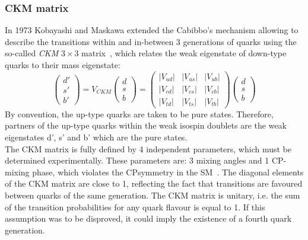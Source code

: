 \subsubsection{CKM matrix}
\label{sec:ckm}
In 1973 Kobayashi and Maskawa extended the Cabibbo's mechanism allowing to describe the transitions within and in-between 3 generations of quarks
using the so-called \textit{CKM} $3\times3$ matrix~\cite{cabibbo,ckm}, which relates the weak eigenstate of down-type quarks to their mass eigenstate:
\begin{equation}
	\begin{pmatrix}
	d' \\ 
	s' \\ 
	b' 
	\end{pmatrix} 
	= V_{CKM}
	\begin{pmatrix}
	d \\ 
	s \\ 
	b
	\end{pmatrix} 
	=
	\begin{pmatrix}
	|V_{ud}| & |V_{us}| & |V_{ub}| \\ 
	|V_{cd}| & |V_{cs}| & |V_{cb}| \\ 
	|V_{td}| & |V_{ts}|  &| V_{tb}|
	\end{pmatrix} 
	\begin{pmatrix}
	d \\ 
	s \\ 
	b
	\end{pmatrix} 
\end{equation}
By  convention, the up-type quarks are taken to be pure states.
Therefore, partners of the up-type quarks within the weak isospin doublets are the weak eigenstates d’, s’ and b’ which are the pure states. \\
The CKM matrix is fully defined by 4 independent parameters, which must be determined experimentally. These parameters are: 3 mixing angles and 1 CP-mixing
phase, which violates the CP\footnotemark symmetry in the SM~\cite{cp_vio}.
The diagonal elements of the CKM matrix are close to 1, reflecting the fact that transitions are favoured between quarks of the same generation. 
The CKM matrix is unitary, i.e. the sum of the transition probabilities for any quark flavour is equal to 1. If this assumption was to be disproved, 
it could imply the existence of a fourth quark generation.


